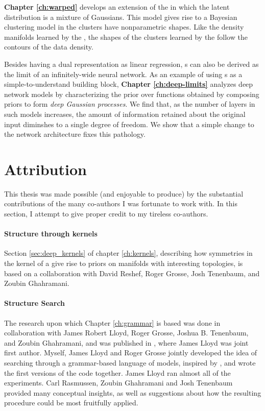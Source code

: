 {\bf Chapter \ref{ch:warped}} develops an extension of the \gplvm{} in which the latent distribution is a mixture of Gaussians.  This model gives rise to a Bayesian clustering model in the clusters have nonparametric shapes.  Like the density manifolds learned by the \gplvm{}, the shapes of the clusters learned by the \iwmm{} follow the contours of the data density.

Besides having a dual representation as linear regression, \gp{}s can also be derived as the limit of an infinitely-wide neural network.
As an example of using \gp{}s as a simple-to-understand building block, {\bf Chapter \ref{ch:deep-limits}} analyzes deep network models by characterizing the prior over functions obtained by composing \gp{} priors to form \emph{deep Gaussian processes}.
We find that, as the number of layers in such models increases, the amount of information retained about the original input diminshes to a single degree of freedom.
We show that a simple change to the network architecture fixes this pathology.


\section{Attribution}

This thesis was made possible (and enjoyable to produce) by the substantial contributions of the many co-authors I was fortunate to work with.
In this section, I %
attempt to give proper credit to my tireless co-authors.

\paragraph{Structure through kernels}
Section \ref{sec:deep_kernels} of chapter \ref{ch:kernels}, describing how symmetries in the kernel of a \gplvm{} give rise to priors on manifolds with interesting topologies, is based on a collaboration with David Reshef, Roger Grosse, Josh Tenenbaum, and Zoubin Ghahramani.

\paragraph{Structure Search}
The research upon which Chapter \ref{ch:grammar} is based was done in collaboration with James Robert Lloyd, Roger Grosse, Joshua B. Tenenbaum, and Zoubin Ghahramani, and was published in \citep{DuvLloGroetal13}, where James Lloyd was joint first author.
Myself, James Lloyd and Roger Grosse jointly developed the idea of searching through a grammar-based language of \gp{} models, inspired by \citet{grosse2012exploiting}, and wrote the first versions of the code together.
James Lloyd ran almost all of the experiments.
 Carl Rasmussen, Zoubin Ghahramani and Josh Tenenbaum provided many conceptual insights, as well as suggestions about how the resulting procedure could be most fruitfully applied.

